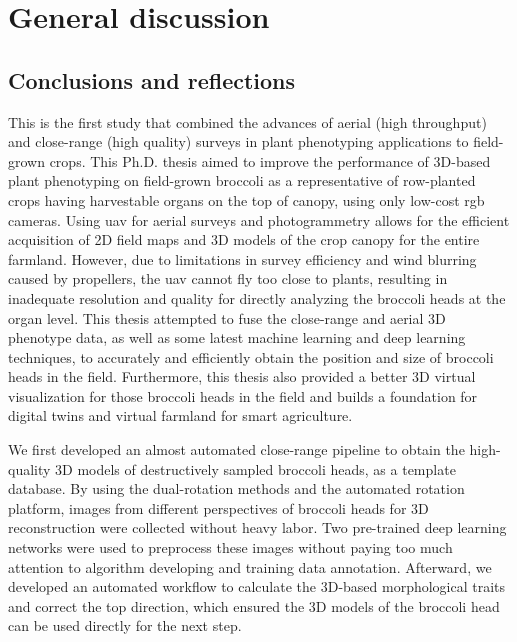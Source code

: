 \chapter{General discussion}

\section{Conclusions and reflections}

This is the first study that combined the advances of aerial (high throughput) and close-range (high quality) surveys in plant phenotyping applications to field-grown crops. This Ph.D. thesis aimed to improve the performance of 3D-based plant phenotyping on field-grown broccoli as a representative of row-planted crops having harvestable organs on the top of canopy, using only low-cost \gls{rgb} cameras. Using \gls{uav} for aerial surveys and photogrammetry allows for the efficient acquisition of 2D field maps and 3D models of the crop canopy for the entire farmland. However, due to limitations in survey efficiency and wind blurring caused by propellers, the \gls{uav} cannot fly too close to plants, resulting in inadequate resolution and quality for directly analyzing the broccoli heads at the organ level. This thesis attempted to fuse the close-range and aerial 3D phenotype data, as well as some latest machine learning and deep learning techniques, to accurately and efficiently obtain the position and size of broccoli heads in the field. Furthermore, this thesis also provided a better 3D virtual visualization for those broccoli heads in the field and builds a foundation for digital twins and virtual farmland for smart agriculture. 

We first developed an almost automated close-range pipeline to obtain the high-quality 3D models of destructively sampled broccoli heads, as a template database. By using the dual-rotation methods and the automated rotation platform, images from different perspectives of broccoli heads for 3D reconstruction were collected without heavy labor. Two pre-trained deep learning networks were used to preprocess these images without paying too much attention to algorithm developing and training data annotation. Afterward, we developed an automated workflow to calculate the 3D-based morphological traits and correct the top direction, which ensured the 3D models of the broccoli head can be used directly for the next step.

